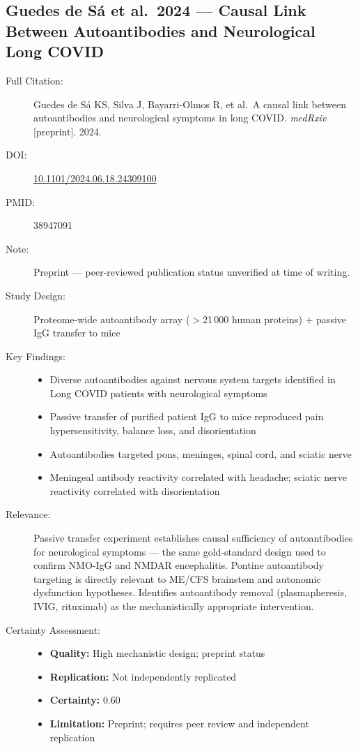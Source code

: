 \subsection{Guedes de S\'a et al.\ 2024 --- Causal Link Between Autoantibodies and Neurological Long COVID}

\begin{description}
    \item[Full Citation:] Guedes de S\'a KS, Silva J, Bayarri-Olmos R, et al.\ A causal link between autoantibodies and neurological symptoms in long COVID. \textit{medRxiv} [preprint]. 2024. \cite{GuedesDeSa2024}
    \item[DOI:] \href{https://doi.org/10.1101/2024.06.18.24309100}{10.1101/2024.06.18.24309100}
    \item[PMID:] 38947091
    \item[Note:] Preprint --- peer-reviewed publication status unverified at time of writing.
    \item[Study Design:] Proteome-wide autoantibody array ($>$21\,000 human proteins) $+$ passive IgG transfer to mice
    \item[Key Findings:]
    \begin{itemize}
        \item Diverse autoantibodies against nervous system targets identified in Long COVID patients with neurological symptoms
        \item Passive transfer of purified patient IgG to mice reproduced pain hypersensitivity, balance loss, and disorientation
        \item Autoantibodies targeted pons, meninges, spinal cord, and sciatic nerve
        \item Meningeal antibody reactivity correlated with headache; sciatic nerve reactivity correlated with disorientation
    \end{itemize}
    \item[Relevance:] Passive transfer experiment establishes causal sufficiency of autoantibodies for neurological symptoms --- the same gold-standard design used to confirm NMO-IgG and NMDAR encephalitis. Pontine autoantibody targeting is directly relevant to ME/CFS brainstem and autonomic dysfunction hypotheses. Identifies autoantibody removal (plasmapheresis, IVIG, rituximab) as the mechanistically appropriate intervention.
    \item[Certainty Assessment:]
    \begin{itemize}
        \item \textbf{Quality:} High mechanistic design; preprint status
        \item \textbf{Replication:} Not independently replicated
        \item \textbf{Certainty:} 0.60
        \item \textbf{Limitation:} Preprint; requires peer review and independent replication
    \end{itemize}
\end{description}

